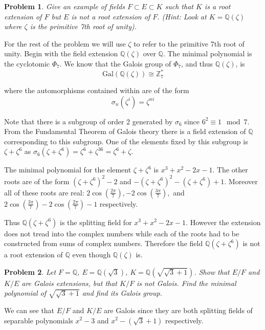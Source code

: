 \documentclass[10pt]{article}
\newcommand{\sk}{\vskip 10mm}
\newcommand{\bb}[1]{\mathbb{#1}}
\theoremstyle{plain}
\newtheorem{problem}{Problem}
\theoremstyle{remark}
\begin{document}
\begin{problem}
  Give an example of fields $F\subset E\subset K$   such that $K$ is a root
  extension of $F$ but $E$ is not a root extension of $F$.
  (Hint: Look at $K=\bb{Q}(\zeta)$ where $\zeta$ is the primitive
  7th root of unity).
\end{problem}

For the rest of the problem we will use $\zeta$ to refer to the
primitive 7th root of unity. Begin with the field extension
$\bb{Q}(\zeta)$ over $\bb{Q}$. The minimal polynomial is the
cyclotomic $\Phi_7$. We know that the Galois group of $\Phi_7$, and
thus $\bb{Q}(\zeta)$, is
\[
  \text{Gal}(\bb{Q}(\zeta))\cong \bb{Z}_7^*
\]

where the automorphisms contained within are of the form
\[
  \sigma_n(\zeta^i)=\zeta^{ni}
\]

Note that there is a subgroup of order 2 generated by
$\sigma_6$ since $6^2\equiv 1\mod 7$. From the Fundamental Theorem of
Galois theory there is a field extension of $\bb{Q}$ corresponding
to this subgroup. One of the elements fixed by this subgroup is
$\zeta+\zeta^6$ as $\sigma_6(\zeta+\zeta^6)=\zeta^6+\zeta^{36}=\zeta^6+\zeta$.

The minimal polynomial for the element $\zeta+\zeta^6$ is
$x^3+x^2-2x-1$. The other roots are of the form
$(\zeta+\zeta^6)^2-2$ and $-(\zeta+\zeta^6)^2-(\zeta+\zeta^6)+1$. Moreover all of these
roots are real: $2\cos(\frac{2\pi}{7}),-2\cos(\frac{3\pi}{7}),$
and $2\cos(\frac{3\pi}{7})-2\cos(\frac{2\pi}{7})-1$ respectively.

Thus $\bb{Q}(\zeta+\zeta^6)$ is the splitting field for $x^3+x^2-2x-1$.
However the extension does not tread into the complex numbers
while each of the roots had to be constructed from sums of
complex numbers. Therefore the field $\bb{Q}(\zeta+\zeta^6)$ is not a
root extension of $\bb{Q}$ even though $\bb{Q}(\zeta)$ is.


\sk

\begin{problem}
  Let $F=\bb{Q}$, $E=\bb{Q}(\sqrt{3})$, $K=\bb{Q}(\sqrt{\sqrt{3}+1})$.
  Show that $E/F$ and $K/E$ are Galois extensions, but that $K/F$
  is not Galois. Find the minimal polynomial of $\sqrt{\sqrt{3}+1}$
  and find its Galois group.
\end{problem}

We can see that $E/F$ and $K/E$ are Galois since they are
both splitting fields of separable polynomials $x^2-3$ and
$x^2-(\sqrt{3}+1)$ respectively.
\end{document}
